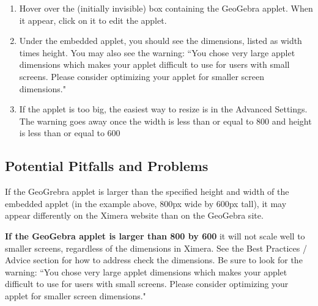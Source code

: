 \documentclass{ximera}
\begin{document}
        \begin{enumerate}
            \item Hover over the (initially invisible) box containing the GeoGebra applet. When it appear, click on it to edit the applet.
            \item Under the embedded applet, you should see the dimensions, listed as width times height. You may also see the warning:
            ``You chose very large applet dimensions which makes your applet difficult to use for users with small screens. Please consider optimizing your applet for smaller screen dimensions."
            \item If the applet is too big, the easiest way to resize is in the Advanced Settings. The warning goes away once the width is less than or equal to 800 and height is less than or equal to 600
        \end{enumerate}
        
    
    \subsection*{Potential Pitfalls and Problems}
        If the GeoGrebra applet is larger than the specified height and width of the embedded applet (in the example above, 800px wide by 600px tall), it may appear differently on the Ximera website than on the GeoGebra site. 

        \textbf{If the GeoGebra applet is larger than 800 by 600} it will not scale well to smaller screens, regardless of the dimensions in Ximera. See the Best Practices / Advice section for how to address check the dimensions. Be sure to look for the warning:
        ``You chose very large applet dimensions which makes your applet difficult to use for users with small screens. Please consider optimizing your applet for smaller screen dimensions."
    
        
        
\end{document}
